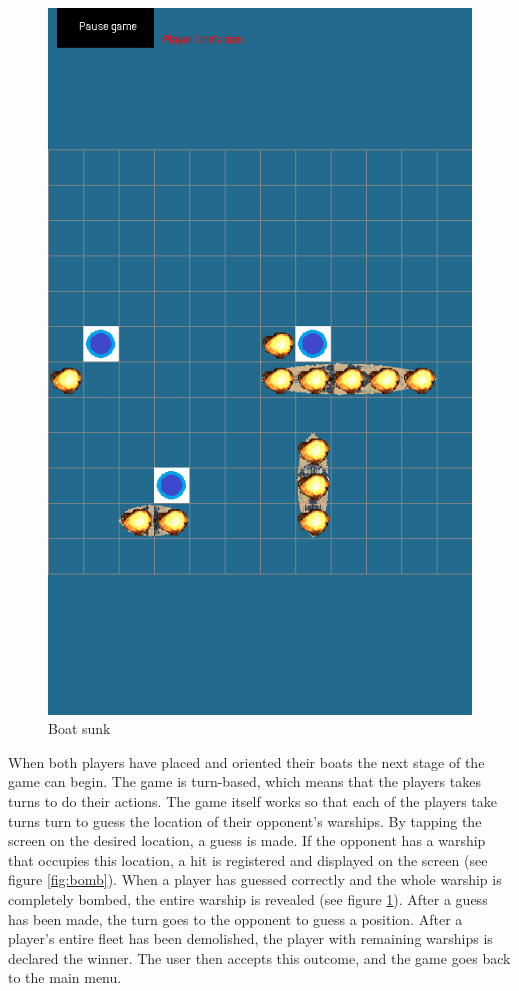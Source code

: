 \begin{figure}[ht]
\begin{minipage}[b]{0.325\linewidth}
		\includegraphics[scale=0.225]{img/Screenshot_sunk.png}
		\caption{Boat sunk}
		\label{fig:sunk}
	\end{minipage}

\end{figure}
When both players have placed and oriented their boats the next stage of the game can begin.
The game is turn-based, which means that the players takes turns to do their actions.
The game itself works so that each of the players take turns turn to guess the location of their opponent's warships. By tapping the screen on the desired location, a guess is made. If the opponent has a warship that occupies this location, a hit is registered and displayed on the screen (see figure \ref{fig:bomb}). When a player has guessed correctly and the whole warship is completely bombed, the entire warship is revealed (see figure \ref{fig:sunk}). After a guess has been made, the turn goes to the opponent to guess a position. After a player's entire fleet has been demolished, the player with remaining warships is declared the winner. The user then accepts this outcome, and the game goes back to the main menu.

